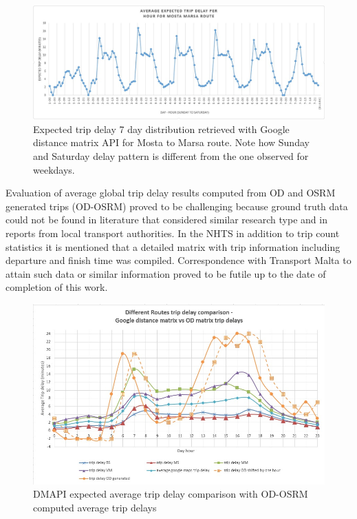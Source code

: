 \documentclass[12pt, a4paper]{report}
\theoremstyle{definition}
\theoremstyle{definition}%
\theoremstyle{definition}%
\theoremstyle{definition}%
\theoremstyle{definition}%
\theoremstyle{definition}%
\begin{document}
\begin{figure}[!]	
	\includegraphics[scale=0.5]{trip_delay_mosta_marsa.jpg}
	\centering
	\caption[Average expected trip delay - 7 day distibution]{Expected trip delay 7 day distribution retrieved with Google distance matrix API for Mosta to Marsa route. Note how Sunday and Saturday delay pattern is different from the one observed for weekdays.}
	\label{fig:trip_delay_mosta_marsa}
\end{figure}

Evaluation of average global trip delay results computed from OD and OSRM generated trips (OD-OSRM) proved to be challenging because ground truth data could not be found in literature that considered similar research type and in reports from local transport authorities. In the NHTS \cite{malta2011national} in addition to trip count statistics it is mentioned that a detailed matrix with trip information including departure and finish time was compiled. Correspondence with Transport Malta to attain such data or similar information proved to be futile up to the date of completion of this work. 


\begin{figure}[h]	
	\includegraphics[scale=0.7]{trip_delay_comparison.jpg}
	\centering
	\caption[Trip delay line chart DMAPI vs OD-OSRM]{DMAPI expected average trip delay comparison with OD-OSRM computed average trip delays}
	\label{fig:trip_delay_google_vs_mine}
\end{figure}
\end{document}
